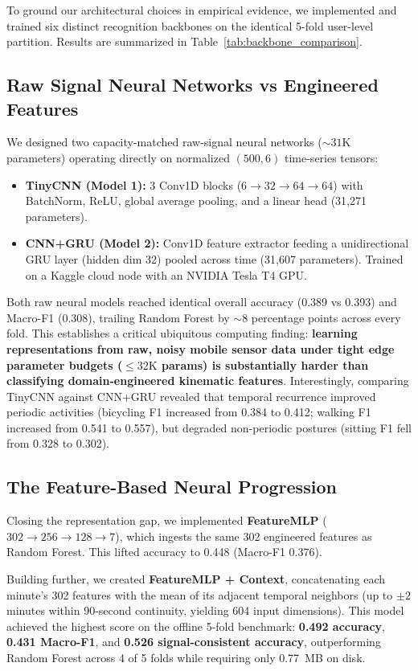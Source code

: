 \documentclass[11pt,a4paper]{article}
\begin{document}
To ground our architectural choices in empirical evidence, we implemented and trained six distinct recognition backbones on the identical 5-fold user-level partition. Results are summarized in Table~\ref{tab:backbone_comparison}.

\subsection{Raw Signal Neural Networks vs Engineered Features}
We designed two capacity-matched raw-signal neural networks ($\sim 31\text{K}$ parameters) operating directly on normalized $(500, 6)$ time-series tensors:
\begin{itemize}[leftmargin=1.5em,noitemsep,topsep=2pt]
  \item \textbf{TinyCNN (Model 1):} 3 Conv1D blocks ($6 \to 32 \to 64 \to 64$) with BatchNorm, ReLU, global average pooling, and a linear head (31,271 parameters).
  \item \textbf{CNN+GRU (Model 2):} Conv1D feature extractor feeding a unidirectional GRU layer (hidden dim 32) pooled across time (31,607 parameters). Trained on a Kaggle cloud node with an NVIDIA Tesla T4 GPU.
\end{itemize}
Both raw neural models reached identical overall accuracy (0.389 vs 0.393) and Macro-F1 (0.308), trailing Random Forest by $\sim 8$ percentage points across every fold. This establishes a critical ubiquitous computing finding: \textbf{learning representations from raw, noisy mobile sensor data under tight edge parameter budgets ($\le 32\text{K}$ params) is substantially harder than classifying domain-engineered kinematic features}. Interestingly, comparing TinyCNN against CNN+GRU revealed that temporal recurrence improved periodic activities (bicycling F1 increased from 0.384 to 0.412; walking F1 increased from 0.541 to 0.557), but degraded non-periodic postures (sitting F1 fell from 0.328 to 0.302).

\subsection{The Feature-Based Neural Progression}
Closing the representation gap, we implemented \textbf{FeatureMLP} ($302 \to 256 \to 128 \to 7$), which ingests the same 302 engineered features as Random Forest. This lifted accuracy to 0.448 (Macro-F1 0.376). 

Building further, we created \textbf{FeatureMLP + Context}, concatenating each minute's 302 features with the mean of its adjacent temporal neighbors (up to $\pm 2$ minutes within 90-second continuity, yielding 604 input dimensions). This model achieved the highest score on the offline 5-fold benchmark: \textbf{0.492 accuracy}, \textbf{0.431 Macro-F1}, and \textbf{0.526 signal-consistent accuracy}, outperforming Random Forest across 4 of 5 folds while requiring only 0.77~MB on disk.
\end{document}
